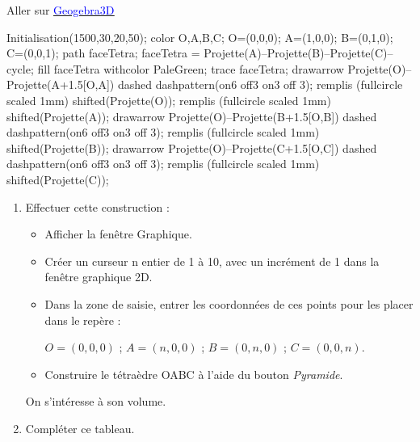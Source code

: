 \begin{exercice*}
    Aller sur \href{https://www.geogebra.org/classic#3d}{\underline{\textcolor{blue}{Geogebra3D}}} \hspace*{10mm}

    \begin{center}
        \begin{Geometrie}[CoinBG={u*(-10,-10)},TypeTrace="Espace"]
            Initialisation(1500,30,20,50);
            color O,A,B,C;
            O=(0,0,0);
            A=(1,0,0);
            B=(0,1,0);
            C=(0,0,1);
            path faceTetra;
            faceTetra = Projette(A)--Projette(B)--Projette(C)--cycle;
            fill faceTetra withcolor PaleGreen;
            trace faceTetra;
            drawarrow Projette(O)--Projette(A+1.5[O,A]) dashed dashpattern(on6 off3 on3 off 3);
            remplis (fullcircle scaled 1mm) shifted(Projette(O));
            remplis (fullcircle scaled 1mm) shifted(Projette(A));
            drawarrow Projette(O)--Projette(B+1.5[O,B]) dashed dashpattern(on6 off3 on3 off 3);
            remplis (fullcircle scaled 1mm) shifted(Projette(B));
            drawarrow Projette(O)--Projette(C+1.5[O,C]) dashed dashpattern(on6 off3 on3 off 3);
            remplis (fullcircle scaled 1mm) shifted(Projette(C));
        \end{Geometrie}
    \end{center}
    \begin{enumerate}
        \item Effectuer cette construction :
        \begin{itemize}
            \item Afficher la fenêtre Graphique.
            \item Créer un curseur n entier de 1 à 10, avec un incrément de 1 dans la fenêtre graphique 2D.
            \item Dans la zone de saisie, entrer les coordonnées de ces points pour les placer dans le repère :
            
            $O=(0,0,0)$ ; $A=( n ,0,0)$ ; $B=(0, n ,0)$ ; $C=(0,0, n )$.
            \item Construire le tétraèdre OABC à l'aide du bouton \textit{Pyramide}.
        \end{itemize}
        On s'intéresse à son volume.
        \item Compléter ce tableau.
        

\end{enumerate}
\end{exercice*}

